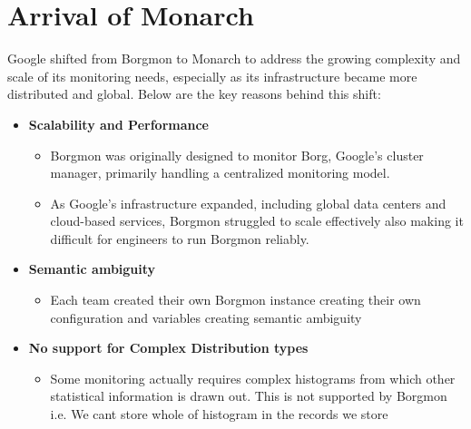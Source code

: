 \section{Arrival of Monarch\cite{50652}}

Google shifted from Borgmon to Monarch to address the growing complexity and scale of its monitoring needs, especially as its infrastructure became more distributed and global. Below are the key reasons behind this shift:

\begin{itemize}
    \item \textbf{Scalability and Performance}
    \begin{itemize}
        \item Borgmon was originally designed to monitor Borg, Google’s cluster manager, primarily handling a centralized monitoring model.
        \item As Google’s infrastructure expanded, including global data centers and cloud-based services, Borgmon struggled to scale effectively also making it difficult for engineers to run Borgmon reliably.
        
    \end{itemize}
    

    \item \textbf{Semantic ambiguity}
    \begin{itemize}
        \item Each team created their own Borgmon instance creating their own configuration and variables creating semantic ambiguity
    \end{itemize}

    \item \textbf{No support for Complex Distribution types}
    \begin{itemize}
        \item Some monitoring actually requires complex histograms from which other statistical information is drawn out. This is not supported by Borgmon i.e. We cant store whole of histogram in the records we store
    \end{itemize}
\end{itemize}




